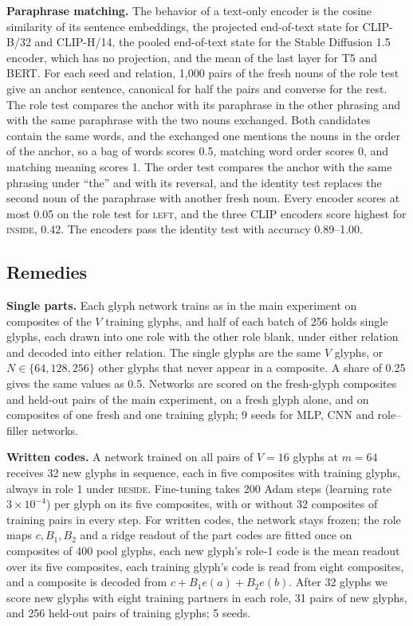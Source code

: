 \documentclass[10pt]{article}
\theoremstyle{plain}
\theoremstyle{remark}
\begin{document}
\textbf{Paraphrase matching.}\label{app:e18} The behavior of a text-only encoder is the cosine similarity of its sentence embeddings, the projected end-of-text state for CLIP-B/32 and CLIP-H/14, the pooled end-of-text state for the Stable Diffusion 1.5 encoder, which has no projection, and the mean of the last layer for T5 and BERT. For each seed and relation, 1{,}000 pairs of the fresh nouns of the role test give an anchor sentence, canonical for half the pairs and converse for the rest. The role test compares the anchor with its paraphrase in the other phrasing and with the same paraphrase with the two nouns exchanged. Both candidates contain the same words, and the exchanged one mentions the nouns in the order of the anchor, so a bag of words scores 0.5, matching word order scores 0, and matching meaning scores 1. The order test compares the anchor with the same phrasing under ``the'' and with its reversal, and the identity test replaces the second noun of the paraphrase with another fresh noun. Every encoder scores at most 0.05 on the role test for \textsc{left}, and the three CLIP encoders score highest for \textsc{inside}, 0.42. The encoders pass the identity test with accuracy 0.89--1.00.

\subsection{Remedies}
\label{app:remedies}

\textbf{Single parts.} Each glyph network trains as in the main experiment on composites of the $V$ training glyphs, and half of each batch of 256 holds single glyphs, each drawn into one role with the other role blank, under either relation and decoded into either relation. The single glyphs are the same $V$ glyphs, or $N \in \{64, 128, 256\}$ other glyphs that never appear in a composite. A share of 0.25 gives the same values as 0.5. Networks are scored on the fresh-glyph composites and held-out pairs of the main experiment, on a fresh glyph alone, and on composites of one fresh and one training glyph; 9 seeds for MLP, CNN and role--filler networks.

\textbf{Written codes.} A network trained on all pairs of $V = 16$ glyphs at $m = 64$ receives 32 new glyphs in sequence, each in five composites with training glyphs, always in role 1 under \textsc{beside}. Fine-tuning takes 200 Adam steps (learning rate $3 \times 10^{-4}$) per glyph on its five composites, with or without 32 composites of training pairs in every step. For written codes, the network stays frozen; the role maps $c, B_1, B_2$ and a ridge readout of the part codes are fitted once on composites of 400 pool glyphs, each new glyph's role-1 code is the mean readout over its five composites, each training glyph's code is read from eight composites, and a composite is decoded from $c + B_1 e(a) + B_2 e(b)$. After 32 glyphs we score new glyphs with eight training partners in each role, 31 pairs of new glyphs, and 256 held-out pairs of training glyphs; 5 seeds.
\end{document}
